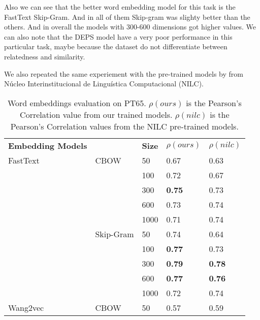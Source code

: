 Also we can see that the better word embedding model for this task is the FastText Skip-Gram. And in all of them Skip-gram was slighty better than the others. And in overall the models with 300-600 dimensions got higher values. We can also note that the DEPS model have a very poor performance in this particular task, maybe because the dataset do not differentiate between relatedness and similarity.

We also repeated the same experiement with the pre-trained models by  from Núcleo Interinstitucional de Linguística Computacional (NILC).


\begin{table}[]
\caption{Word embeddings evaluation on PT65. \textbf{$\rho(ours)$} is the Pearson’s Correlation value from our trained models. \textbf{$\rho(nilc)$} is the Pearson’s Correlation values from the NILC pre-trained models.}
\label{tab:evaluation:we}
\centering%
\begin{minipage}{.65\textwidth}
\begin{tabular}{@{}lllll@{}}
\cmidrule(r){1-5}
\textbf{Embedding Models} &      & \textbf{Size} & \textbf{$\rho(ours)$} & \textbf{$\rho(nilc)$} \\ \cmidrule(r){1-5}
FastText            & CBOW          & 50   & 0.67             & 0.63            \\
                    &               & 100  & 0.72             & 0.67            \\
                    &               & 300  & \textbf{0.75}    & 0.73            \\
                    &               & 600  & 0.73             & 0.74            \\
                    &               & 1000 & 0.71             & 0.74            \\ \cmidrule(lr){2-5}
                    & Skip-Gram     & 50   & 0.74             & 0.64            \\
                    &               & 100  & \textbf{0.77}    & 0.73            \\
                    &               & 300  & \textbf{0.79}    & \textbf{0.78}   \\
                    &               & 600  & \textbf{0.77}    & \textbf{0.76}   \\
                    &               & 1000 & 0.72             & 0.74            \\ \cmidrule(r){1-5}
Wang2vec            & CBOW          & 50   & 0.57             & 0.59            \\

\end{tabular}
\end{minipage}
\end{table}
